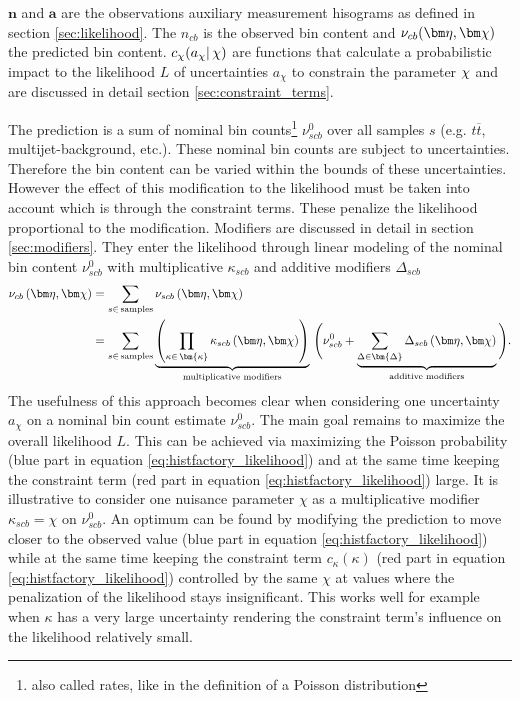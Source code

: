 $\bm{n}$ and $\bm{a}$ are the observations auxiliary measurement hisograms as defined in section \ref{sec:likelihood}. The $n_{cb}$ is the observed bin content and $\nu_{cb}(\freeset,\constrset)$ the predicted bin content. $c_{\chi}(a_{\chi} |\, \chi)$ are functions that calculate a probabilistic impact to the likelihood $L$ of uncertainties $a_\chi$ to constrain the parameter $\chi$ and are discussed in detail section \ref{sec:constraint_terms}.

The prediction is a sum of nominal bin counts\footnote{also called rates, like in the definition of a Poisson distribution} $\nu_{scb}^0$ over all samples $s$ (e.g. $t\overline{t}$, multijet-background, etc.). These nominal bin counts are subject to uncertainties. Therefore the bin content can be varied within the bounds of these uncertainties. However the effect of this modification to the likelihood must be taken into account which is through the constraint terms. These penalize the likelihood proportional to the modification. Modifiers are discussed in detail in section \ref{sec:modifiers}. They enter the likelihood through linear modeling of the nominal bin content $\nu_{scb}^0$ with multiplicative $\kappa_{scb}$ and additive modifiers $\Delta_{scb}$ 
\begin{align}
    \nu_{cb}\left(\freeset,\constrset\right) & = \sum_{s\in\mathrm{\,samples}} \nu_{scb}\left(\freeset,\constrset\right)                                                                                                \\
                                             & = \sum_{s\in\mathrm{\,samples}}\underbrace{\left(\prod_{\kappa\in\,\bm{\kappa}} \kappa_{scb}\left(\freeset,\constrset\right)\right)}_{\text{multiplicative modifiers}}\,
    \Bigg(\nu_{scb}^0 + \underbrace{\sum_{\Delta\in\bm{\Delta}} \Delta_{scb}\left(\freeset,\constrset\right)}_{\text{additive modifiers}}\Bigg).
    \label{eq:modifier_equation}
\end{align}
The usefulness of this approach becomes clear when considering one uncertainty $a_\chi$ on a nominal bin count estimate $\nu_{scb}^0$. The main goal remains to maximize the overall likelihood $L$. This can be achieved via maximizing the Poisson probability (blue part in equation \ref{eq:histfactory_likelihood}) and at the same time keeping the constraint term (red part in equation \ref{eq:histfactory_likelihood}) large. It is illustrative to consider one nuisance parameter $\chi$ as a multiplicative modifier $\kappa_{scb}=\chi$ on $\nu_{scb}^0$. An optimum can be found by modifying the prediction to move closer to the observed value (blue part in equation \ref{eq:histfactory_likelihood}) while at the same time keeping the constraint term $c_\kappa(\kappa)$ (red part in equation \ref{eq:histfactory_likelihood}) controlled by the same $\chi$ at values where the penalization of the likelihood stays insignificant. This works well for example when $\kappa$ has a very large uncertainty rendering the constraint term's influence on the likelihood relatively small. 

